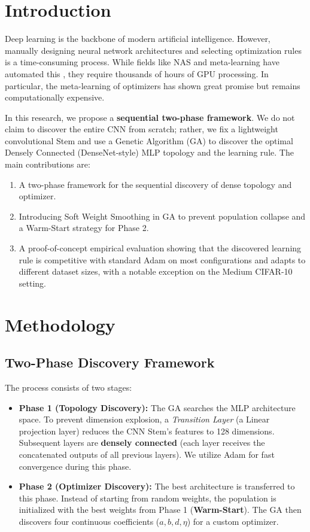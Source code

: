 \documentclass[preprint,12pt,review]{elsarticle}
\begin{document}

\section{Introduction}\label{sec1}
Deep learning is the backbone of modern artificial intelligence. However, manually designing neural network architectures and selecting optimization rules is a time-consuming process. While fields like NAS and meta-learning have automated this \cite{ref1, ref2}, they require thousands of hours of GPU processing. In particular, the meta-learning of optimizers \cite{ref4} has shown great promise but remains computationally expensive.

In this research, we propose a \textbf{sequential two-phase framework}. We do not claim to discover the entire CNN from scratch; rather, we fix a lightweight convolutional Stem and use a Genetic Algorithm (GA) to discover the optimal Densely Connected (DenseNet-style) MLP topology and the learning rule. The main contributions are:
\begin{enumerate}
    \item A two-phase framework for the sequential discovery of dense topology and optimizer.
    \item Introducing Soft Weight Smoothing in GA to prevent population collapse and a Warm-Start strategy for Phase 2.
    \item A proof-of-concept empirical evaluation showing that the discovered learning rule is competitive with standard Adam on most configurations and adapts to different dataset sizes, with a notable exception on the Medium CIFAR-10 setting.
\end{enumerate}

\section{Methodology}\label{sec2}

\subsection{Two-Phase Discovery Framework}
The process consists of two stages:
\begin{itemize}
    \item \textbf{Phase 1 (Topology Discovery):} The GA searches the MLP architecture space. To prevent dimension explosion, a \textit{Transition Layer} (a Linear projection layer) reduces the CNN Stem's features to 128 dimensions. Subsequent layers are \textbf{densely connected} (each layer receives the concatenated outputs of all previous layers). We utilize Adam for fast convergence during this phase.
    \item \textbf{Phase 2 (Optimizer Discovery):} The best architecture is transferred to this phase. Instead of starting from random weights, the population is initialized with the best weights from Phase 1 (\textbf{Warm-Start}). The GA then discovers four continuous coefficients (\(a, b, d, \eta\)) for a custom optimizer.
\end{itemize}
\end{document}
